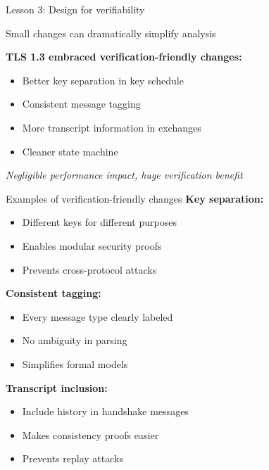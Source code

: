 \documentclass[aspectratio=169, lualatex, handout]{beamer}
\begin{document}
\begin{frame}{Lesson 3: Design for verifiability}
	\begin{center}
		\Large
		Small changes can dramatically simplify analysis
	\end{center}
	\vspace{1em}
	\textbf{TLS 1.3 embraced verification-friendly changes:}
	\begin{itemize}
		\item Better key separation in key schedule
		\item Consistent message tagging
		\item More transcript information in exchanges
		\item Cleaner state machine
	\end{itemize}
	\vspace{0.5em}
	\begin{center}
		\textit{Negligible performance impact, huge verification benefit}
	\end{center}
\end{frame}

\begin{frame}{Examples of verification-friendly changes}
	\textbf{Key separation:}
	\begin{itemize}
		\item Different keys for different purposes
		\item Enables modular security proofs
		\item Prevents cross-protocol attacks
	\end{itemize}
	\vspace{0.5em}
	\textbf{Consistent tagging:}
	\begin{itemize}
		\item Every message type clearly labeled
		\item No ambiguity in parsing
		\item Simplifies formal models
	\end{itemize}
	\vspace{0.5em}
	\textbf{Transcript inclusion:}
	\begin{itemize}
		\item Include history in handshake messages
		\item Makes consistency proofs easier
		\item Prevents replay attacks
	\end{itemize}
\end{frame}
\end{document}
